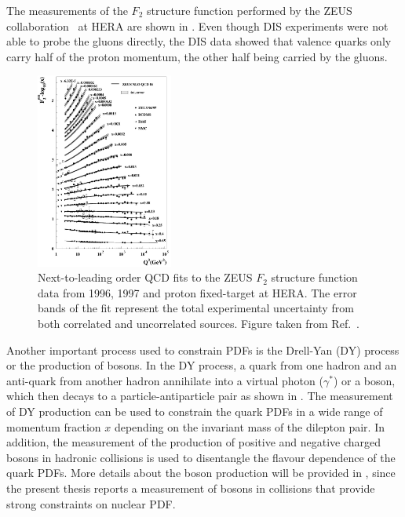 The measurements of the $F_{2}$ structure function performed by the ZEUS collaboration~\cite{HERAStrucFunc} at HERA are shown in . Even though DIS experiments were not able to probe the gluons directly, the DIS data showed that valence quarks only carry half of the proton momentum, the other half being carried by the gluons.

\begin{figure}[!htb]
 \centering
 \includegraphics[width=0.4\textwidth]{Figures/Introduction/StandardModel/Structure_Function.png}
 \caption{Next-to-leading order QCD fits to the ZEUS $F_{2}$ structure function data from 1996, 1997 and proton fixed-target at HERA. The error bands of the fit represent the total experimental uncertainty from both correlated and uncorrelated sources. Figure taken from Ref.~\cite{HERAStrucFunc}.}
 \label{fig:HERAStrucFunc}
\end{figure}

Another important process used to constrain PDFs is the Drell-Yan (DY) process or the production of \Wb bosons. In the DY process, a quark from one hadron and an anti-quark from another hadron annihilate into a virtual photon ($\gamma^{*}$) or a \Z boson, which then decays to a particle-antiparticle pair as shown in . The measurement of DY production can be used to constrain the quark PDFs in a wide range of momentum fraction $x$ depending on the invariant mass of the dilepton pair. In addition, the measurement of the production of positive and negative charged \Wb bosons in hadronic collisions is used to disentangle the flavour dependence of the quark PDFs. More details about the \Wb boson production will be provided in , since the present thesis reports a measurement of \Wb bosons in \RunpPb collisions that provide strong constraints on nuclear PDF.

